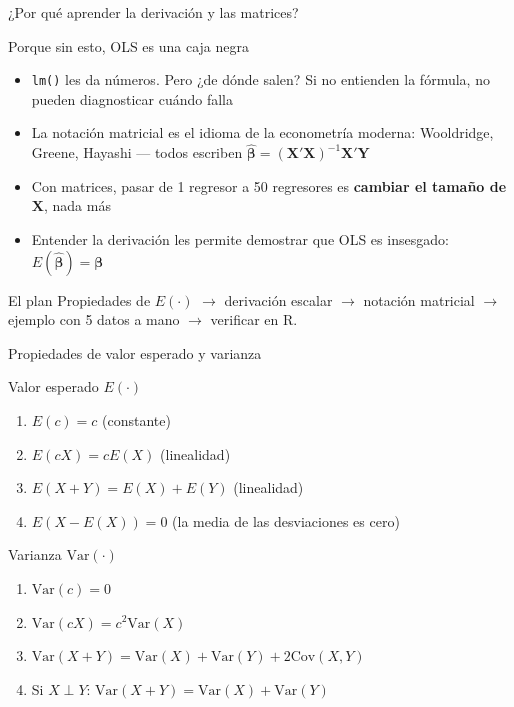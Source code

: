 \documentclass[aspectratio=169, 11pt]{beamer}
\begin{document}

\begin{frame}{¿Por qué aprender la derivación y las matrices?}
\begin{exampleblock}{Porque sin esto, OLS es una caja negra}
\small
\begin{itemize}\setlength{\itemsep}{3pt}
  \item \texttt{lm()} les da números. Pero ¿de dónde salen? Si no entienden la fórmula, no pueden diagnosticar cuándo falla
  \item La notación matricial es el idioma de la econometría moderna: Wooldridge, Greene, Hayashi --- todos escriben $\hat{\boldsymbol{\beta}} = (\mathbf{X}'\mathbf{X})^{-1}\mathbf{X}'\mathbf{Y}$
  \item Con matrices, pasar de 1 regresor a 50 regresores es \textbf{cambiar el tamaño de $\mathbf{X}$}, nada más
  \item Entender la derivación les permite demostrar que OLS es insesgado: $E(\hat{\boldsymbol{\beta}}) = \boldsymbol{\beta}$
\end{itemize}
\end{exampleblock}

\begin{alertblock}{El plan}
\small Propiedades de $E(\cdot)$ $\to$ derivación escalar $\to$ notación matricial $\to$ ejemplo con 5 datos a mano $\to$ verificar en R.
\end{alertblock}
\end{frame}


\begin{frame}{Propiedades de valor esperado y varianza}
\small
\begin{block}{Valor esperado $E(\cdot)$}
\begin{enumerate}\setlength{\itemsep}{1pt}
  \item $E(c) = c$ \quad (constante)
  \item $E(cX) = cE(X)$ \quad (linealidad)
  \item $E(X + Y) = E(X) + E(Y)$ \quad (linealidad)
  \item $E(X - E(X)) = 0$ \quad (la media de las desviaciones es cero)
\end{enumerate}
\end{block}

\begin{block}{Varianza $\text{Var}(\cdot)$}
\begin{enumerate}\setlength{\itemsep}{1pt}
  \item $\text{Var}(c) = 0$
  \item $\text{Var}(cX) = c^2 \text{Var}(X)$
  \item $\text{Var}(X + Y) = \text{Var}(X) + \text{Var}(Y) + 2\text{Cov}(X,Y)$
  \item Si $X \perp Y$: $\text{Var}(X + Y) = \text{Var}(X) + \text{Var}(Y)$
\end{enumerate}
\end{block}

 
\end{frame}
\end{document}
